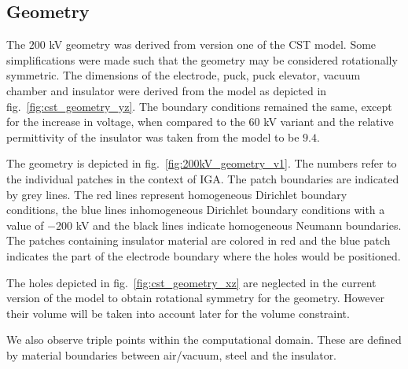 \subsection{Geometry}
The $200$ kV geometry was derived from version one of the CST model. Some simplifications were made such that the geometry may be considered rotationally symmetric. The dimensions of the electrode, puck, puck elevator, vacuum chamber and insulator were derived from the model as depicted in fig.~\ref{fig:cst_geometry_yz}. The boundary conditions remained the same, except for the increase in voltage, when compared to the $60$ kV variant and the relative permittivity of the insulator was taken from the model to be $9.4$.

The geometry is depicted in fig.~\ref{fig:200kV_geometry_v1}. The numbers refer to the individual patches in the context of IGA. The patch boundaries are indicated by grey lines. The red lines represent homogeneous Dirichlet boundary conditions, the blue lines inhomogeneous Dirichlet boundary conditions with a value of $-200$ kV and the black lines indicate homogeneous Neumann boundaries.
The patches containing insulator material are colored in red and the blue patch indicates the part of the electrode boundary where the holes would be positioned.

The holes depicted in fig.~\ref{fig:cst_geometry_xz} are neglected in the current version of the model to obtain rotational symmetry for the geometry. However their volume will be taken into account later for the volume constraint.

We also observe triple points within the computational domain. These are defined by material boundaries between air/vacuum, steel and the insulator.

